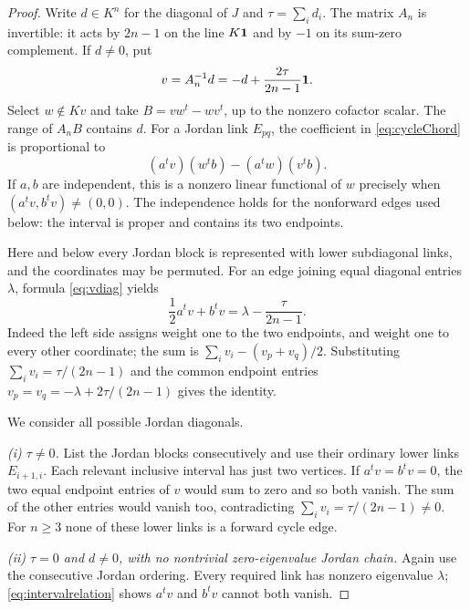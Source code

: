 \begin{proof}
Write $d\in K^n$ for the diagonal of $J$ and $\tau=\sum_i d_i$.
The matrix $A_n$ is invertible: it acts by $2n-1$ on the line
$K\mathbf{1}$ and by $-1$ on its sum-zero complement. If $d\ne0$, put
\begin{equation}\label{eq:vdiag}
 v=A_n^{-1}d=-d+\frac{2\tau}{2n-1}\mathbf{1}.
\end{equation}
Select $w\notin Kv$ and take $B=vw^t-wv^t$, up to the nonzero
cofactor scalar. The range of $A_nB$ contains $d$. For a Jordan
link $E_{pq}$, the coefficient in \eqref{eq:cycleChord} is
proportional to
\begin{equation}\label{eq:linw}
 (a^tv)(w^tb)-(a^tw)(v^tb).
\end{equation}
If $a,b$ are independent, this is a nonzero linear functional of
$w$ precisely when $(a^tv,b^tv)\ne(0,0)$. The independence holds
for the nonforward edges used below: the interval is proper and
contains its two endpoints.

Here and below every Jordan block is represented with lower
subdiagonal links, and the coordinates may be permuted. For an
edge joining equal diagonal entries $\lambda$, formula
\eqref{eq:vdiag} yields
\begin{equation}\label{eq:intervalrelation}
 \frac12a^tv+b^tv=\lambda-\frac{\tau}{2n-1}.
\end{equation}
Indeed the left side assigns weight one to the two endpoints,
and weight one to every other coordinate; the sum is
$\sum_i v_i-(v_p+v_q)/2$. Substituting
$\sum_i v_i=\tau/(2n-1)$ and the common endpoint entries
$v_p=v_q=-\lambda+2\tau/(2n-1)$ gives the identity.

We consider all possible Jordan diagonals.
\smallskip

\noindent\emph{(i) $\tau\ne0$.}
List the Jordan blocks consecutively and use their ordinary lower
links $E_{i+1,i}$. Each relevant inclusive interval has just two
vertices. If $a^tv=b^tv=0$, the two equal endpoint entries of $v$
would sum to zero and so both vanish. The sum of the other entries
would vanish too, contradicting
$\sum_i v_i=\tau/(2n-1)\ne0$. For $n\ge3$ none of these lower
links is a forward cycle edge.

\smallskip
\noindent\emph{(ii) $\tau=0$ and $d\ne0$, with no nontrivial
zero-eigenvalue Jordan chain.}
Again use the consecutive Jordan ordering. Every required link
has nonzero eigenvalue $\lambda$; \eqref{eq:intervalrelation}
shows $a^tv$ and $b^tv$ cannot both vanish.


\end{proof}
